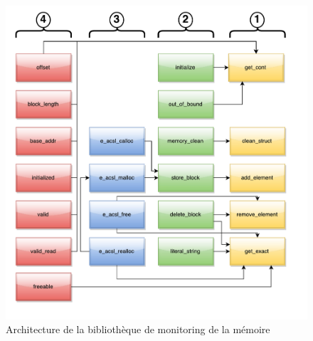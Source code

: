 \begin{figure}[h!]
  \centering
  \includegraphics[scale=.55]{figures/mmodel_architecture.pdf}
  \vspace{-.8cm}
  \caption{Architecture de la bibliothèque de monitoring de la mémoire
    \label{fig:mmodel-architecture}}
\end{figure}

